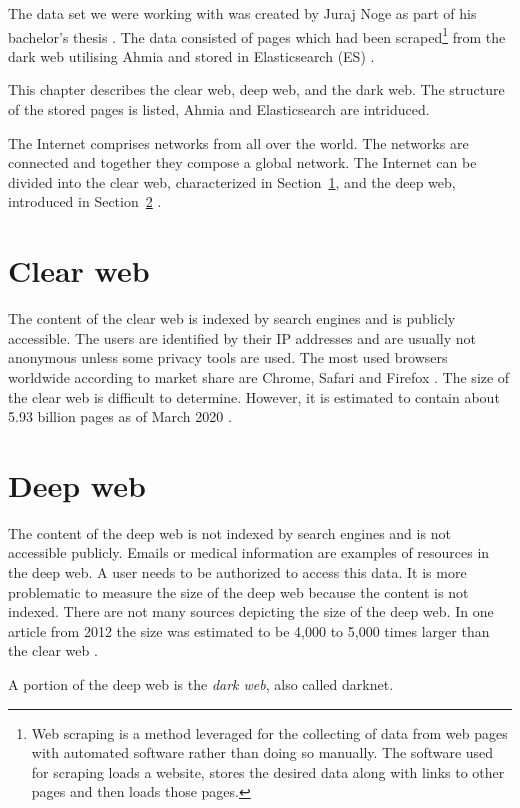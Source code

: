\label{datasetAnalysis}
The data set we were working with was created by Juraj Noge as part of his bachelor's thesis \cite{bcScraping}. The data consisted of pages which had been scraped\footnote{Web scraping is a method leveraged for the collecting of data from web pages with automated software rather than doing so manually. The software used for scraping loads a website, stores the desired data along with links to other pages and then loads those pages.} from the dark web utilising Ahmia \cite{ahmia} and stored in Elasticsearch (ES) \cite{elasticSearch} \cite{bcScraping}. 

This chapter describes the clear web, deep web, and the dark web. The structure of the stored pages is listed, Ahmia and Elasticsearch are intriduced.

The Internet comprises networks from all over the world. The networks are connected and together they compose a global network. The Internet can be divided into the clear web, characterized in Section~\ref{clearWeb}, and the deep web, introduced in Section~\ref{deepWeb} \cite{internetStructure}.

\section{Clear web} \label{clearWeb}
The content of the clear web is indexed by search engines and is publicly accessible. The users are identified by their IP addresses and are usually not anonymous unless some privacy tools are used. The most used browsers worldwide according to market share are Chrome, Safari and Firefox \cite{browserMarketShare}. The size of the clear web is difficult to determine. However, it is estimated to contain about 5.93 billion pages as of March 2020 \cite{clearWebSize}.

\section{Deep web} \label{deepWeb}
The content of the deep web is not indexed by search engines and is not accessible publicly. Emails or medical information are examples of resources in the deep web. A user needs to be authorized to access this data. It is more problematic to measure the size of the deep web because the content is not indexed. There are not many sources depicting the size of the deep web. In one article from 2012 the size was estimated to be 4,000 to 5,000 times larger than the clear web \cite{deepWebSize}. 

A portion of the deep web is the \textit{dark web}, also called darknet. 
